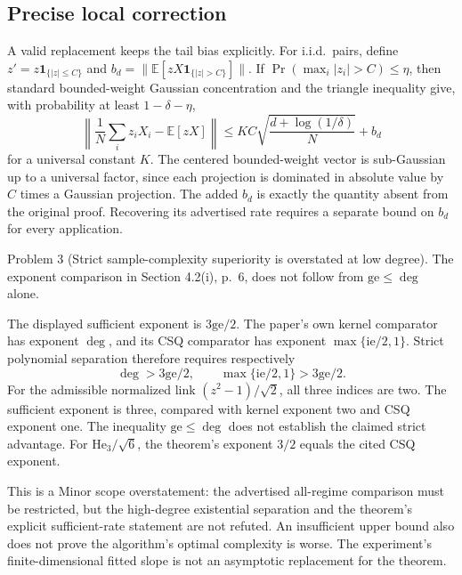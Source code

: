 \documentclass[10pt]{article}
\begin{document}
\subsection*{Precise local correction}
A valid replacement keeps the tail bias explicitly. For i.i.d. pairs, define \(z'=z\mathbf1_{\{|z|\le C\}}\) and \(b_d=\|\mathbb E[zX\mathbf1_{\{|z|>C\}}]\|\). If \(\Pr(\max_i|z_i|>C)\le\eta\), then standard bounded-weight Gaussian concentration and the triangle inequality give, with probability at least \(1-\delta-\eta\), \[\left\|\frac1N\sum_i z_iX_i-\mathbb E[zX]\right\|
 \le K C\sqrt{\frac{d+\log(1/\delta)}{N}}+b_d\] for a universal constant \(K\). The centered bounded-weight vector is sub-Gaussian up to a universal factor, since each projection is dominated in absolute value by \(C\) times a Gaussian projection. The added \(b_d\) is exactly the quantity absent from the original proof. Recovering its advertised rate requires a separate bound on \(b_d\) for every application.\par
Problem 3 (Strict sample-complexity superiority is overstated at low degree).  The exponent comparison in Section 4.2(i), p. 6, does not follow from \(\mathrm{ge}\le\deg\) alone.\par
The displayed sufficient exponent is \(3\mathrm{ge}/2\). The paper’s own kernel comparator has exponent \(\deg\), and its CSQ comparator has exponent \(\max\{\mathrm{ie}/2,1\}\). Strict polynomial separation therefore requires respectively \[\deg>3\mathrm{ge}/2,\qquad
 \max\{\mathrm{ie}/2,1\}>3\mathrm{ge}/2 .\] For the admissible normalized link \((z^2-1)/\sqrt2\), all three indices are two. The sufficient exponent is three, compared with kernel exponent two and CSQ exponent one. The inequality \(\mathrm{ge}\le\deg\) does not establish the claimed strict advantage. For \(\mathrm{He}_3/\sqrt6\), the theorem’s exponent \(3/2\) equals the cited CSQ exponent.\par
This is a Minor scope overstatement: the advertised all-regime comparison must be restricted, but the high-degree existential separation and the theorem’s explicit sufficient-rate statement are not refuted. An insufficient upper bound also does not prove the algorithm’s optimal complexity is worse. The experiment’s finite-dimensional fitted slope is not an asymptotic replacement for the theorem.\par
\end{document}
